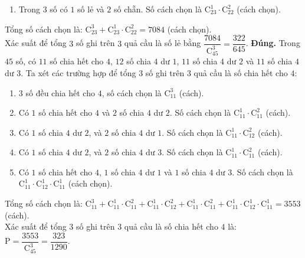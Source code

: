 \begin{ex}
{\begin{itemchoice}
\begin{enumerate}
				\item Trong $3$ số có $1$ số lẻ và $2$ số chẵn. Số cách chọn là $\mathrm{C}_{23}^1 \cdot \mathrm{C}_{22}^2$ (cách chọn).
			\end{enumerate}
			Tổng số cách chọn là: $\mathrm{C}_{23}^3 + \mathrm{C}_{23}^1 \cdot \mathrm{C}_{22}^2 = 7084$ (cách chọn). \\
			Xác suất để tổng $3$ số ghi trên $3$ quả cầu là số lẻ bằng $\dfrac{7084}{\mathrm{C}_{45}^3} = \dfrac{322}{645}$.
			\itemch \textbf{Đúng.} Trong $45$ số, có $11$ số chia hết cho $4$, $12$ số chia $4$ dư $1$, $11$ số chia $4$ dư $2$ và $11$ số chia $4$ dư $3$.
			Ta xét các trường hợp để tổng $3$ số ghi trên $3$ quả cầu là số chia hết cho $4$:
			\begin{enumerate}
				\item $3$ số đều chia hết cho $4$, số cách chọn là $\mathrm{C}_{11}^3$ (cách).
				\item Có $1$ số chia hết cho $4$ và $2$ số chia $4$ dư $2$. Số cách chọn là $\mathrm{C}_{11}^1 \cdot \mathrm{C}_{11}^2$ (cách).
				\item Có $1$ số chia $4$ dư $2$, và $2$ số chia $4$ dư $1$. Số cách chọn là $\mathrm{C}_{11}^1 \cdot \mathrm{C}_{12}^2$ (cách).
				\item Có $1$ số chia $4$ dư $2$, và $2$ số chia $4$ dư $3$. Số cách chọn là $\mathrm{C}_{11}^1 \cdot \mathrm{C}_{11}^2$ (cách).
				\item Có $1$ số chia hết cho $4$, $1$ số chia $4$ dư $1$ và $1$ số chia $4$ dư $3$. Số cách chọn là $\mathrm{C}_{11}^1 \cdot \mathrm{C}_{12}^1 \cdot \mathrm{C}_{11}^1$ (cách chọn).
			\end{enumerate}
			Tổng số cách chọn là: $\mathrm{C}_{11}^3 + \mathrm{C}_{11}^1 \cdot \mathrm{C}_{11}^2 + \mathrm{C}_{11}^1 \cdot \mathrm{C}_{12}^2 + \mathrm{C}_{11}^1 \cdot \mathrm{C}_{11}^2 + \mathrm{C}_{11}^1 \cdot \mathrm{C}_{12}^1 \cdot \mathrm{C}_{11}^1 = 3553$ (cách). \\
			Xác suất để tổng $3$ số ghi trên $3$ quả cầu là số chia hết cho $4$ là: $\mathrm{P} = \dfrac{3553}{\mathrm{C}_{45}^3} = \dfrac{323}{1290}$.
		\end{itemchoice}
	}
\end{ex}

